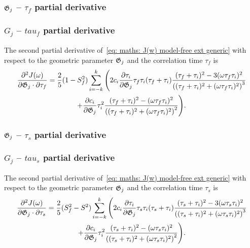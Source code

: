 \begin{latexonly}
    \subsubsection{$\mathfrak{G}_j$ -- $\tau_f$ partial derivative}
\end{latexonly}
\begin{htmlonly}
    \subsubsection{$G_j$ -- $tau_f$ partial derivative}
\end{htmlonly}

The second partial derivative of~\eqref{eq: maths: J(w) model-free ext generic} with respect to the geometric parameter $\mathfrak{G}_j$ and the correlation time $\tau_f$ is
\begin{multline}
    \frac{\partial^2 J(\omega)}{\partial \mathfrak{G}_j \cdot \partial \tau_f} = \frac{2}{5} (1 - S^2_f) \sum_{i=-k}^k \Bigg(
        2 c_i \frac{\partial \tau_i}{\partial \mathfrak{G}_j} \tau_f \tau_i (\tau_f + \tau_i)
            \frac{(\tau_f + \tau_i)^2 - 3(\omega \tau_f \tau_i)^2}{\left((\tau_f + \tau_i)^2 + (\omega \tau_f \tau_i)^2 \right)^3}  \\
        + \frac{\partial c_i}{\partial \mathfrak{G}_j} \tau_i^2 \frac{(\tau_f + \tau_i)^2 - (\omega \tau_f \tau_i)^2}{\left((\tau_f + \tau_i)^2 + (\omega \tau_f \tau_i)^2 \right)^2}
    \Bigg).
\end{multline}



\begin{latexonly}
    \subsubsection{$\mathfrak{G}_j$ -- $\tau_s$ partial derivative}
\end{latexonly}
\begin{htmlonly}
    \subsubsection{$G_j$ -- $tau_s$ partial derivative}
\end{htmlonly}

The second partial derivative of~\eqref{eq: maths: J(w) model-free ext generic} with respect to the geometric parameter $\mathfrak{G}_j$ and the correlation time $\tau_s$ is
\begin{multline}
    \frac{\partial^2 J(\omega)}{\partial \mathfrak{G}_j \cdot \partial \tau_s} = \frac{2}{5} (S^2_f - S^2) \sum_{i=-k}^k \Bigg(
        2 c_i \frac{\partial \tau_i}{\partial \mathfrak{G}_j} \tau_s \tau_i (\tau_s + \tau_i)
            \frac{(\tau_s + \tau_i)^2 - 3(\omega \tau_s \tau_i)^2}{\left((\tau_s + \tau_i)^2 + (\omega \tau_s \tau_i)^2 \right)^3}  \\
        + \frac{\partial c_i}{\partial \mathfrak{G}_j} \tau_i^2 \frac{(\tau_s + \tau_i)^2 - (\omega \tau_s \tau_i)^2}{\left((\tau_s + \tau_i)^2 + (\omega \tau_s \tau_i)^2 \right)^2}
    \Bigg).
\end{multline}



